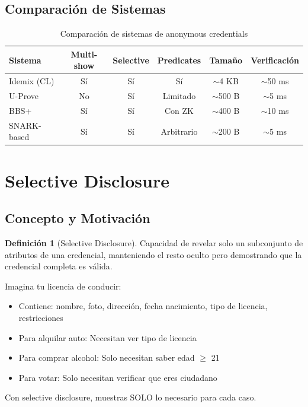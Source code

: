 \documentclass[11pt,a4paper,twoside]{book}
\theoremstyle{definition}
\newtheorem{definition}{Definición}[chapter]
\theoremstyle{remark}
\begin{document}
\subsection{Comparación de Sistemas}

\begin{table}[htbp]
\centering
\small
\begin{tabular}{lccccc}
\toprule
\textbf{Sistema} & \textbf{Multi-show} & \textbf{Selective} & \textbf{Predicates} & \textbf{Tamaño} & \textbf{Verificación} \\
\midrule
Idemix (CL) & Sí & Sí & Sí & $\sim$4 KB & $\sim$50 ms \\
U-Prove & No & Sí & Limitado & $\sim$500 B & $\sim$5 ms \\
BBS+ & Sí & Sí & Con ZK & $\sim$400 B & $\sim$10 ms \\
SNARK-based & Sí & Sí & Arbitrario & $\sim$200 B & $\sim$5 ms \\
\bottomrule
\end{tabular}
\caption{Comparación de sistemas de anonymous credentials}
\end{table}

\section{Selective Disclosure}
\label{sec:selective-disclosure}

\subsection{Concepto y Motivación}

\begin{definition}[Selective Disclosure]
Capacidad de revelar solo un subconjunto de atributos de una credencial, manteniendo el resto oculto pero demostrando que la credencial completa es válida.
\end{definition}

\begin{intuicion}
Imagina tu licencia de conducir:
\begin{itemize}
    \item Contiene: nombre, foto, dirección, fecha nacimiento, tipo de licencia, restricciones
    \item Para alquilar auto: Necesitan ver tipo de licencia
    \item Para comprar alcohol: Solo necesitan saber edad $\geq$ 21
    \item Para votar: Solo necesitan verificar que eres ciudadano
\end{itemize}

Con selective disclosure, muestras SOLO lo necesario para cada caso.
\end{intuicion}
\end{document}
